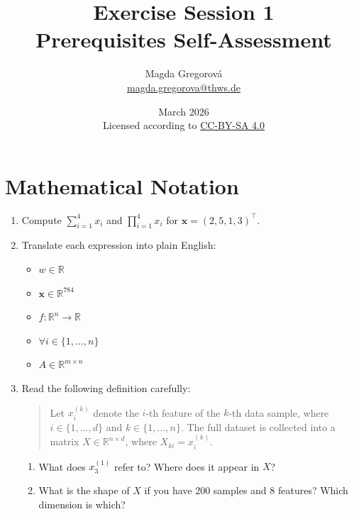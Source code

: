 \documentclass[12pt, a4paper]{scrartcl}
\title{Exercise Session 1\\
\large Prerequisites Self-Assessment}
\author{Magda Gregorová\\
{\small \href{mailto:magda.gregorova@thws.de}{magda.gregorova@thws.de}}}
\date{{\small March 2026 \\[0.3em]
Licensed according to
\href{https://creativecommons.org/licenses/by-sa/4.0}{CC-BY-SA 4.0}}}
\begin{document}
\maketitle


\bigskip

\tableofcontents
\newpage

\section{Mathematical Notation}

\begin{enumerate}

    \item Compute $\displaystyle\sum_{i=1}^{4} x_i$ and $\displaystyle\prod_{i=1}^{4} x_i$
    for $\mathbf{x} = (2, 5, 1, 3)^\top$.

\item Translate each expression into plain English:

\begin{itemize}
    \item $w \in \mathbb{R}$
    \item $\mathbf{x} \in \mathbb{R}^{784}$
    \item $f: \mathbb{R}^n \to \mathbb{R}$
    \item $\forall i \in \{1, \ldots, n\}$
    \item $A \in \mathbb{R}^{m \times n}$
\end{itemize}

\item Read the following definition carefully:

\begin{quote}
Let $x_i^{(k)}$ denote the $i$-th feature of the $k$-th data sample, where $i
\in \{1, \ldots, d\}$ and $k \in \{1, \ldots, n\}$. The full dataset is
collected into a matrix $X \in \mathbb{R}^{n \times d}$, where $X_{ki} =
x_i^{(k)}$.
\end{quote}

\begin{enumerate}

    \item What does $x_3^{(1)}$ refer to? Where does it appear in $X$?

    \item What is the shape of $X$ if you have 200 samples and 8 features?
    Which dimension is which?


\end{enumerate}
\end{enumerate}
\end{document}
